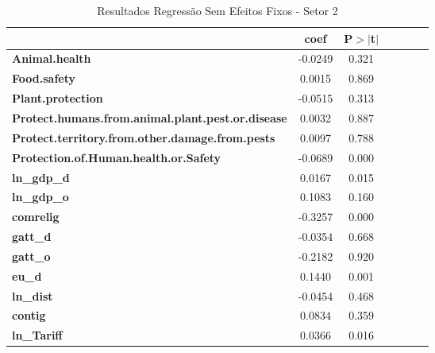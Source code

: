\begin{table}[ht!]
    \begin{center}
        \begin{tabular}{lcccccc}
            & \textbf{coef} & \textbf{P$> |$t$|$}\\
            \midrule
\textbf{Animal.health}                                    &      -0.0249  &  0.321 \\
\textbf{Food.safety}                                      &       0.0015  &  0.869 \\
\textbf{Plant.protection}                                 &      -0.0515  &  0.313 \\
\textbf{Protect.humans.from.animal.plant.pest.or.disease} &       0.0032  &  0.887 \\
\textbf{Protect.territory.from.other.damage.from.pests}   &       0.0097  &  0.788 \\
\textbf{Protection.of.Human.health.or.Safety}             &      -0.0689  &  0.000 \\
\textbf{ln\_gdp\_d}                                       &       0.0167  &  0.015 \\
\textbf{ln\_gdp\_o}                                       &       0.1083  &  0.160 \\
\textbf{comrelig}                                         &      -0.3257  &  0.000 \\
\textbf{gatt\_d}                                          &      -0.0354  &  0.668 \\
\textbf{gatt\_o}                                          &      -0.2182  &  0.920 \\
\textbf{eu\_d}                                            &       0.1440  &  0.001 \\
\textbf{ln\_dist}                                         &      -0.0454  &  0.468 \\
\textbf{contig}                                           &       0.0834  &  0.359 \\
\textbf{ln\_Tariff}                                       &       0.0366  &  0.016 \\
\bottomrule
\end{tabular}
\caption{Resultados Regressão Sem Efeitos Fixos - Setor 2}
\end{center}
\end{table}
